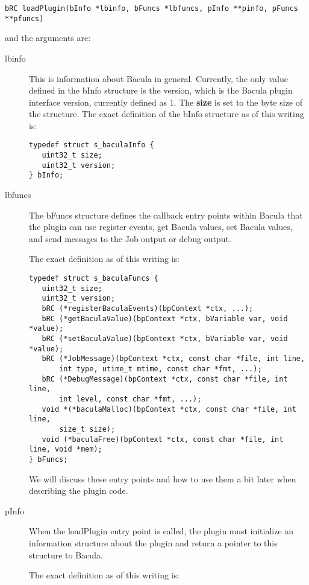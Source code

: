 \begin{verbatim}
bRC loadPlugin(bInfo *lbinfo, bFuncs *lbfuncs, pInfo **pinfo, pFuncs **pfuncs)
\end{verbatim}

and the arguments are:

\begin{description}
\item [lbinfo]
This is information about Bacula in general. Currently, the only value
defined in the bInfo structure is the version, which is the Bacula plugin 
interface version, currently defined as 1.  The {\bf size} is set to the
byte size of the structure. The exact definition of the bInfo structure
as of this writing is: 

\begin{verbatim}
typedef struct s_baculaInfo {
   uint32_t size;
   uint32_t version;
} bInfo;
\end{verbatim}

\item [lbfuncs]
The bFuncs structure defines the callback entry points within Bacula
that the plugin can use register events, get Bacula values, set
Bacula values, and send messages to the Job output or debug output.

The exact definition as of this writing is:
\begin{verbatim}
typedef struct s_baculaFuncs {
   uint32_t size;
   uint32_t version;
   bRC (*registerBaculaEvents)(bpContext *ctx, ...);
   bRC (*getBaculaValue)(bpContext *ctx, bVariable var, void *value);
   bRC (*setBaculaValue)(bpContext *ctx, bVariable var, void *value);
   bRC (*JobMessage)(bpContext *ctx, const char *file, int line,
       int type, utime_t mtime, const char *fmt, ...);
   bRC (*DebugMessage)(bpContext *ctx, const char *file, int line,
       int level, const char *fmt, ...);
   void *(*baculaMalloc)(bpContext *ctx, const char *file, int line,
       size_t size);
   void (*baculaFree)(bpContext *ctx, const char *file, int line, void *mem);
} bFuncs;
\end{verbatim}

We will discuss these entry points and how to use them a bit later when
describing the plugin code.


\item [pInfo]
When the loadPlugin entry point is called, the plugin must initialize
an information structure about the plugin and return a pointer to
this structure to Bacula.

The exact definition as of this writing is:


\end{description}
